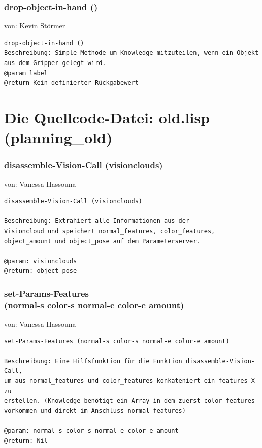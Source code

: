 \documentclass{suturo}
\makeatletter
\newcommand{\chapterauthor}[1]{%
  {\parindent0pt\vspace*{-27pt}%
  \linespread{0}\small\begin{flushright}von: #1\end{flushright}%
  \par\nobreak\vspace*{0pt}}
  \@afterheading%
}
\makeatother
\begin{document}
\subsubsection{drop-object-in-hand ()}
\chapterauthor{Kevin Störmer}
\begin{verbatim}
drop-object-in-hand ()
Beschreibung: Simple Methode um Knowledge mitzuteilen, wenn ein Objekt 
aus dem Gripper gelegt wird.
@param label
@return Kein definierter Rückgabewert
\end{verbatim}

\newpage

\section{Die Quellcode-Datei: old.lisp (planning\_old)}

\subsubsection{disassemble-Vision-Call (visionclouds)}
\chapterauthor{Vanessa Hassouna}
\begin{verbatim}
disassemble-Vision-Call (visionclouds)

Beschreibung: Extrahiert alle Informationen aus der 
Visioncloud und speichert normal_features, color_features, 
object_amount und object_pose auf dem Parameterserver.
 
@param: visionclouds
@return: object_pose
\end{verbatim}



\subsubsection{set-Params-Features \\
(normal-s color-s normal-e color-e amount)}
\chapterauthor{Vanessa Hassouna}
\begin{verbatim}
set-Params-Features (normal-s color-s normal-e color-e amount)

Beschreibung: Eine Hilfsfunktion für die Funktion disassemble-Vision-Call, 
um aus normal_features und color_features konkateniert ein features-X zu 
erstellen. (Knowledge benötigt ein Array in dem zuerst color_features 
vorkommen und direkt im Anschluss normal_features)

@param: normal-s color-s normal-e color-e amount
@return: Nil
\end{verbatim}
\end{document}
